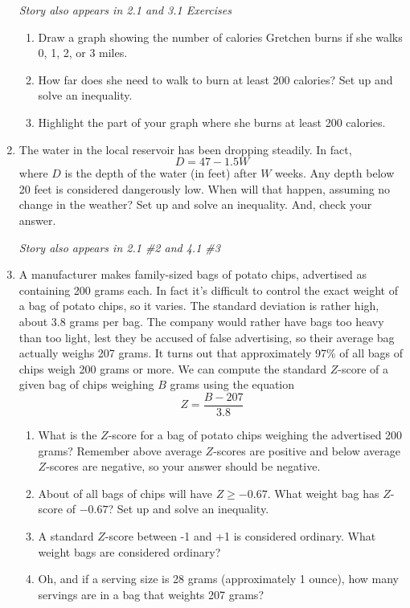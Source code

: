\begin{enumerate}
\hfill \emph{Story also appears in 2.1 and 3.1 Exercises}
\begin{enumerate}
\item Draw a graph showing the number of calories Gretchen burns if she walks 0, 1, 2, or 3 miles.
\item How far does she need to walk to burn at least 200 calories? Set up and solve an inequality.
\item Highlight the part of your graph where she burns at least 200 calories.
\end{enumerate}

\item The water in the local reservoir has been dropping steadily.  In fact, $$D = 47-1.5W$$ where $D$ is the depth of the water (in feet) after $W$ weeks.  Any depth below 20 feet is considered dangerously low.  When will that happen, assuming no change in the weather?  Set up and solve an inequality.  And, check your answer.

\hfill \emph{Story also appears in 2.1 \#2 and 4.1 \#3}

\item A manufacturer makes family-sized bags of potato chips, advertised as containing 200 grams each.  In fact it's difficult to control the exact weight of a bag of potato chips, so it varies. The standard deviation is rather high, about 3.8 grams per bag.  The company would rather have bags too heavy than too light, lest they be accused of false advertising, so their average bag actually weighs 207 grams.  It turns out that approximately 97\% of all bags of chips weigh 200 grams or more.  We can compute the standard $Z$-score of a given bag of chips weighing $B$ grams using the equation $$Z = \frac{B-207}{3.8}$$
\begin{enumerate}
\item What is the $Z$-score for a bag of potato chips weighing the advertised 200 grams?  Remember above average $Z$-scores are positive and below average $Z$-scores are negative, so your answer should be negative.  
\item About  of all bags of chips will have $Z \ge -0.67$.  What weight bag has $Z$-score of $-0.67$?  Set up and solve an inequality.
\item A standard $Z$-score between -1 and +1 is considered ordinary.  What weight bags are considered ordinary? 
\item Oh, and if a serving size is 28 grams (approximately 1 ounce), how many servings are in a bag that weights 207 grams?
\end{enumerate}


\end{enumerate}
